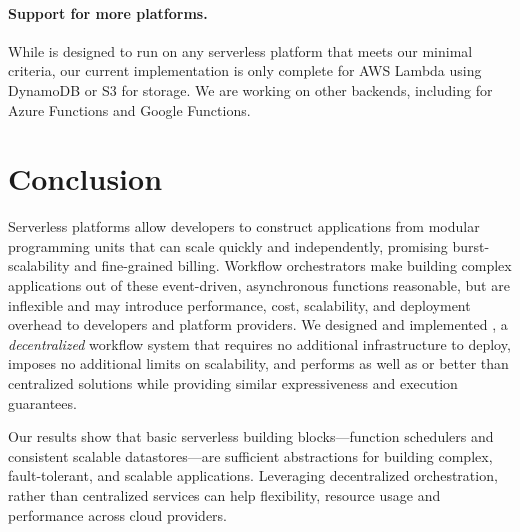 \paragraph{Support for more platforms.} While \name{} is designed
to run on any serverless platform that meets our minimal criteria, our current
implementation is only complete for AWS Lambda using DynamoDB or S3 for storage.
We are working on other backends, including for Azure Functions and Google
Functions.

\section{Conclusion}\label{sec:conclusion}

Serverless platforms allow developers to construct applications from modular
programming units that can scale quickly and independently, promising
burst-scalability and fine-grained billing. Workflow orchestrators make building
complex applications out of these event-driven, asynchronous functions
reasonable, but are inflexible and may introduce performance, cost, scalability,
and deployment overhead to developers and platform providers. We designed and
implemented \name{}, a \emph{decentralized} workflow system that requires no
additional infrastructure to deploy, imposes no additional limits on
scalability, and performs as well as or better than centralized solutions while
providing similar expressiveness and execution guarantees.

Our results show that basic serverless building blocks---function schedulers
and consistent scalable datastores---are sufficient abstractions for building
complex, fault-tolerant, and scalable applications. Leveraging decentralized
orchestration, rather than centralized services can help \secondedits
{flexibility, resource usage and performance} across cloud providers.
